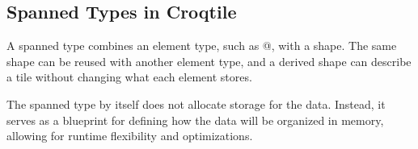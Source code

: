 \subsection*{Spanned Types in Croqtile}

A spanned type combines an element type, such as @, with a shape. The same shape can be reused with another element type, and a derived shape can describe a tile without changing what each element stores.

The spanned type by itself does not allocate storage for the data. Instead, it serves as a blueprint for defining how the data will be organized in memory, allowing for runtime flexibility and optimizations.
